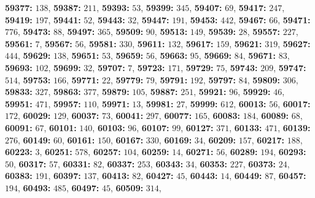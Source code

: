 \textsf{\bfseries 59377:} $138$, \textsf{\bfseries 59387:} $211$, \textsf{\bfseries 59393:} $53$, \textsf{\bfseries 59399:} $345$, \textsf{\bfseries 59407:} $69$, \textsf{\bfseries 59417:} $247$, \textsf{\bfseries 59419:} $197$, \textsf{\bfseries 59441:} $52$, \textsf{\bfseries 59443:} $32$, \textsf{\bfseries 59447:} $191$, \textsf{\bfseries 59453:} $442$, \textsf{\bfseries 59467:} $66$, \textsf{\bfseries 59471:} $776$, \textsf{\bfseries 59473:} $88$, \textsf{\bfseries 59497:} $365$, \textsf{\bfseries 59509:} $90$, \textsf{\bfseries 59513:} $149$, \textsf{\bfseries 59539:} $28$, \textsf{\bfseries 59557:} $227$, \textsf{\bfseries 59561:} $7$, \textsf{\bfseries 59567:} $56$, \textsf{\bfseries 59581:} $330$, \textsf{\bfseries 59611:} $132$, \textsf{\bfseries 59617:} $159$, \textsf{\bfseries 59621:} $319$, \textsf{\bfseries 59627:} $444$, \textsf{\bfseries 59629:} $138$, \textsf{\bfseries 59651:} $53$, \textsf{\bfseries 59659:} $56$, \textsf{\bfseries 59663:} $95$, \textsf{\bfseries 59669:} $84$, \textsf{\bfseries 59671:} $83$, \textsf{\bfseries 59693:} $102$, \textsf{\bfseries 59699:} $32$, \textsf{\bfseries 59707:} $7$, \textsf{\bfseries 59723:} $171$, \textsf{\bfseries 59729:} $75$, \textsf{\bfseries 59743:} $209$, \textsf{\bfseries 59747:} $514$, \textsf{\bfseries 59753:} $166$, \textsf{\bfseries 59771:} $22$, \textsf{\bfseries 59779:} $79$, \textsf{\bfseries 59791:} $192$, \textsf{\bfseries 59797:} $84$, \textsf{\bfseries 59809:} $306$, \textsf{\bfseries 59833:} $327$, \textsf{\bfseries 59863:} $377$, \textsf{\bfseries 59879:} $105$, \textsf{\bfseries 59887:} $251$, \textsf{\bfseries 59921:} $96$, \textsf{\bfseries 59929:} $46$, \textsf{\bfseries 59951:} $471$, \textsf{\bfseries 59957:} $110$, \textsf{\bfseries 59971:} $13$, \textsf{\bfseries 59981:} $27$, \textsf{\bfseries 59999:} $612$, \textsf{\bfseries 60013:} $56$, \textsf{\bfseries 60017:} $172$, \textsf{\bfseries 60029:} $129$, \textsf{\bfseries 60037:} $73$, \textsf{\bfseries 60041:} $297$, \textsf{\bfseries 60077:} $165$, \textsf{\bfseries 60083:} $184$, \textsf{\bfseries 60089:} $68$, \textsf{\bfseries 60091:} $67$, \textsf{\bfseries 60101:} $140$, \textsf{\bfseries 60103:} $96$, \textsf{\bfseries 60107:} $99$, \textsf{\bfseries 60127:} $371$, \textsf{\bfseries 60133:} $471$, \textsf{\bfseries 60139:} $276$, \textsf{\bfseries 60149:} $60$, \textsf{\bfseries 60161:} $150$, \textsf{\bfseries 60167:} $330$, \textsf{\bfseries 60169:} $34$, \textsf{\bfseries 60209:} $157$, \textsf{\bfseries 60217:} $188$, \textsf{\bfseries 60223:} $3$, \textsf{\bfseries 60251:} $578$, \textsf{\bfseries 60257:} $104$, \textsf{\bfseries 60259:} $14$, \textsf{\bfseries 60271:} $56$, \textsf{\bfseries 60289:} $194$, \textsf{\bfseries 60293:} $50$, \textsf{\bfseries 60317:} $57$, \textsf{\bfseries 60331:} $82$, \textsf{\bfseries 60337:} $253$, \textsf{\bfseries 60343:} $34$, \textsf{\bfseries 60353:} $227$, \textsf{\bfseries 60373:} $24$, \textsf{\bfseries 60383:} $191$, \textsf{\bfseries 60397:} $137$, \textsf{\bfseries 60413:} $82$, \textsf{\bfseries 60427:} $45$, \textsf{\bfseries 60443:} $14$, \textsf{\bfseries 60449:} $87$, \textsf{\bfseries 60457:} $194$, \textsf{\bfseries 60493:} $485$, \textsf{\bfseries 60497:} $45$, \textsf{\bfseries 60509:} $314$, 
